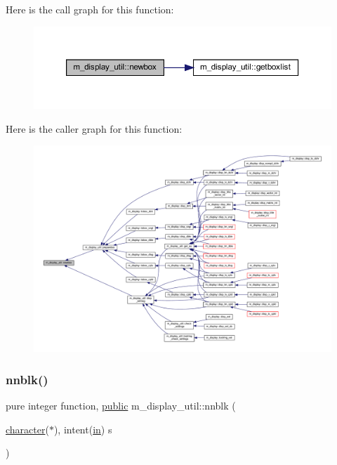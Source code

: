 Here is the call graph for this function\+:
\nopagebreak
\begin{figure}[H]
\begin{center}
\leavevmode
\includegraphics[width=350pt]{namespacem__display__util_a5c3310ac01f093fd857b2a3aa3189e02_cgraph}
\end{center}
\end{figure}
Here is the caller graph for this function\+:
\nopagebreak
\begin{figure}[H]
\begin{center}
\leavevmode
\includegraphics[width=350pt]{namespacem__display__util_a5c3310ac01f093fd857b2a3aa3189e02_icgraph}
\end{center}
\end{figure}
\mbox{\label{namespacem__display__util_a03c9a1c990a26433230412d78fa46999}} 
\subsubsection{\texorpdfstring{nnblk()}{nnblk()}}
{\footnotesize\ttfamily pure integer function, \hyperlink{M__stopwatch_83_8txt_a2f74811300c361e53b430611a7d1769f}{public} m\+\_\+display\+\_\+util\+::nnblk (\begin{DoxyParamCaption}\item[{\hyperlink{option__stopwatch_83_8txt_abd4b21fbbd175834027b5224bfe97e66}{character}($\ast$), intent(\hyperlink{M__journal_83_8txt_afce72651d1eed785a2132bee863b2f38}{in})}]{s }\end{DoxyParamCaption})}

